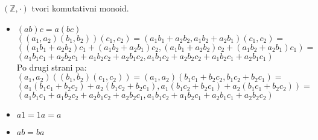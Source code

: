 \begin{trditev}
    $(\mathbb{Z}, \cdot)$ tvori komutativni monoid.
\end{trditev}
\begin{dokaz}
    \begin{itemize}
        \item $(ab)c = a(bc)$\\
        $((a_1,a_2)(b_1,b_2))(c_1,c_2) = (a_1 b_1 + a_2 b_2, a_1 b_2 + a_2 b_1)(c_1, c_2) = $
        $((a_1 b_1 + a_2 b_2)c_1 + (a_1 b_2 + a_2 b_1)c_2, (a_1 b_1 + a_2 b_2)c_2 + (a_1 b_2 + a_2 b_1)c_1) = $
        $(a_1 b_1 c_1 + a_2 b_2 c_1 + a_1 b_2 c_2 + a_2 b_1 c_2, a_1 b_1 c_2 + a_2 b_2 c_2 + a_1 b_2 c_1 + a_2 b_1 c_1)$ \\
        Po drugi strani pa:\\
        $(a_1,a_2)((b_1,b_2)(c_1,c_2)) = (a_1,a_2)(b_1 c_1 + b_2 c_2, b_1 c_2 + b_2 c_1) =$
        $(a_1(b_1 c_1 + b_2 c_2) + a_2(b_1 c_2 + b_2 c_1), a_1(b_1 c_2 + b_2 c_1) + a_2(b_1 c_1 + b_2 c_2)) =$
        $(a_1 b_1 c_1 + a_1 b_2 c_2 + a_2 b_1 c_2 + a_2 b_2 c_1, a_1 b_1 c_2 + a_1 b_2 c_1 + a_2 b_1 c_1 + a_2 b_2 c_2)$
        \item $a1 = 1a = a$\\
        \item $ab = ba$\\
    \end{itemize}
\end{dokaz}